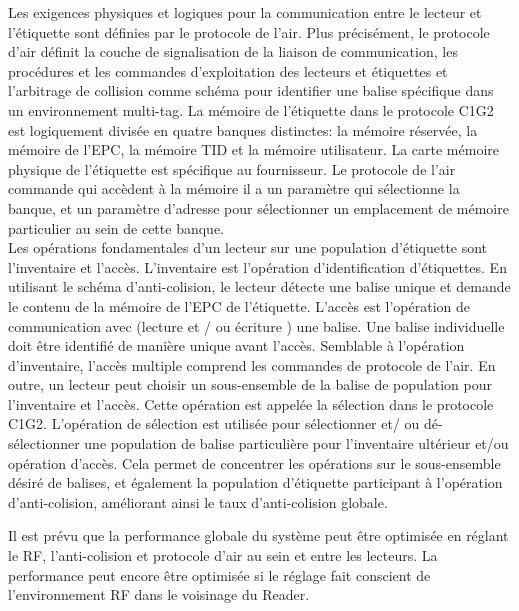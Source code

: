 \documentclass[11pt, a4paper, twoside]{book}
\begin{document}
Les exigences physiques et logiques pour la communication entre le lecteur et l'étiquette sont définies par le protocole de l'air. Plus précisément, le protocole d'air définit la couche de signalisation de la liaison de communication, les procédures et les commandes d'exploitation des lecteurs et étiquettes et l'arbitrage de collision comme schéma pour identifier une balise spécifique  dans un environnement multi-tag. La mémoire de l'étiquette dans le protocole C1G2 est logiquement divisée en quatre banques distinctes: la mémoire réservée, la mémoire de l'EPC, la mémoire TID et la mémoire utilisateur. La carte mémoire physique de l'étiquette est spécifique au fournisseur. Le protocole de l'air commande qui accèdent à la mémoire il a un paramètre qui sélectionne la banque, et un paramètre d'adresse pour sélectionner un emplacement de mémoire particulier au sein de cette banque.\\


Les opérations fondamentales d'un lecteur sur une population d'étiquette sont l'inventaire et l'accès. L'inventaire est l'opération  d'identification d'étiquettes. En utilisant le schéma d'anti-colision, le lecteur détecte une balise unique et demande le contenu de la mémoire de l'EPC de l'étiquette. L'accès est l'opération de communication avec (lecture et / ou écriture ) une balise. Une balise individuelle doit être identifié de manière unique avant l'accès. Semblable à l'opération d'inventaire, l'accès multiple comprend les commandes de protocole de l'air. En outre, un lecteur peut choisir un sous-ensemble de la balise de population pour l'inventaire et l'accès. Cette opération est appelée la sélection dans le protocole C1G2. L'opération de sélection est utilisée pour sélectionner et/ ou dé-sélectionner une population de balise particulière pour l'inventaire ultérieur et/ou opération d'accès. Cela permet de concentrer les opérations sur le sous-ensemble désiré de balises, et également la population d'étiquette participant à l'opération  d'anti-colision, améliorant ainsi le taux d'anti-colision globale.

Il est prévu que la performance globale du système peut être optimisée en réglant le RF, l'anti-colision et protocole d'air au sein et entre les lecteurs. La performance peut encore être optimisée si le réglage fait conscient de l'environnement RF dans le voisinage du Reader.\\
\end{document}
